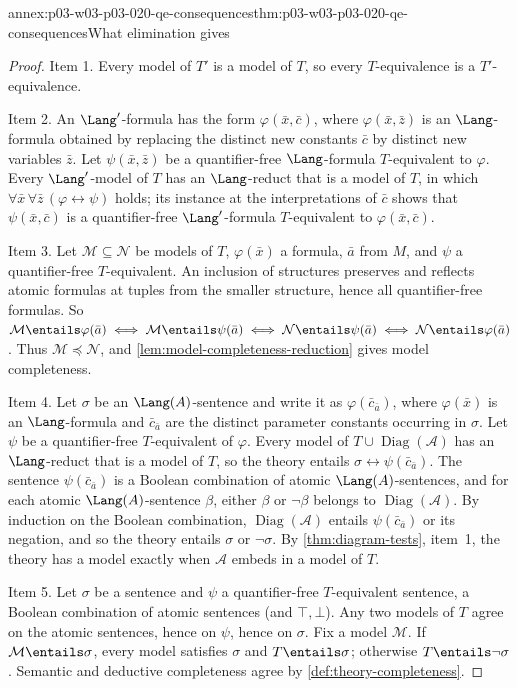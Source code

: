 \begin{annexitem}{annex:p03-w03-p03-020-qe-consequences}{thm:p03-w03-p03-020-qe-consequences}{What elimination gives}
\begin{proof}
Item 1. Every model of \(T'\) is a model of \(T\), so every
\(T\)-equivalence is a \(T'\)-equivalence.

Item 2. An \(\Lang'\)-formula has the form \(\varphi(\bar x,\bar c)\), where
\(\varphi(\bar x,\bar z)\) is an \(\Lang\)-formula obtained by replacing the
distinct new constants \(\bar c\) by distinct new variables \(\bar z\). Let
\(\psi(\bar x,\bar z)\) be a quantifier-free \(\Lang\)-formula
\(T\)-equivalent to \(\varphi\). Every \(\Lang'\)-model of \(T\) has an
\(\Lang\)-reduct that is a model of \(T\), in which
\(\forall\bar x\,\forall\bar z\,(\varphi\leftrightarrow\psi)\) holds; its
instance at the interpretations of \(\bar c\) shows that
\(\psi(\bar x,\bar c)\) is a quantifier-free \(\Lang'\)-formula
\(T\)-equivalent to \(\varphi(\bar x,\bar c)\).

Item 3. Let \(\mathcal M\subseteq\mathcal N\) be models of \(T\),
\(\varphi(\bar x)\) a formula, \(\bar a\) from \(M\), and \(\psi\) a
quantifier-free \(T\)-equivalent. An inclusion of structures preserves and
reflects atomic formulas at tuples from the smaller structure, hence all
quantifier-free formulas. So
\(\mathcal M\entails\varphi(\bar a)\iff\mathcal M\entails\psi(\bar a)\iff
\mathcal N\entails\psi(\bar a)\iff\mathcal N\entails\varphi(\bar a)\). Thus
\(\mathcal M\preccurlyeq\mathcal N\), and
\cref{lem:model-completeness-reduction} gives model completeness.

Item 4. Let \(\sigma\) be an \(\Lang(A)\)-sentence and write it as
\(\varphi(\bar c_{\bar a})\), where \(\varphi(\bar x)\) is an
\(\Lang\)-formula and \(\bar c_{\bar a}\) are the distinct parameter
constants occurring in \(\sigma\). Let \(\psi\) be a quantifier-free
\(T\)-equivalent of \(\varphi\). Every model of
\(T\cup\operatorname{Diag}(\mathcal A)\) has an \(\Lang\)-reduct that is a
model of \(T\), so the theory entails
\(\sigma\leftrightarrow\psi(\bar c_{\bar a})\). The sentence
\(\psi(\bar c_{\bar a})\) is a Boolean combination of atomic
\(\Lang(A)\)-sentences, and for each atomic \(\Lang(A)\)-sentence
\(\beta\), either \(\beta\) or \(\neg\beta\) belongs to
\(\operatorname{Diag}(\mathcal A)\). By induction on the Boolean
combination, \(\operatorname{Diag}(\mathcal A)\) entails
\(\psi(\bar c_{\bar a})\) or its negation, and so the theory entails
\(\sigma\) or \(\neg\sigma\). By \cref{thm:diagram-tests}, item~1, the
theory has a model exactly when \(\mathcal A\) embeds in a model of \(T\).

Item 5. Let \(\sigma\) be a sentence and \(\psi\) a quantifier-free
\(T\)-equivalent sentence, a Boolean combination of atomic sentences (and
\(\top,\bot\)). Any two models of \(T\) agree on the atomic sentences,
hence on \(\psi\), hence on \(\sigma\). Fix a model \(\mathcal M\). If
\(\mathcal M\entails\sigma\), every model satisfies \(\sigma\) and
\(T\entails\sigma\); otherwise \(T\entails\neg\sigma\). Semantic and
deductive completeness agree by \cref{def:theory-completeness}.
\end{proof}
\end{annexitem}

